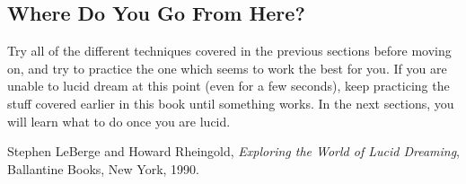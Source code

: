 \documentclass{article}
\begin{document}
\subsection{Where Do You Go From Here?}
Try all of the different techniques covered in the previous sections before moving on, and try to practice the one which seems to work the best for you. If you are unable to lucid dream at this point (even for a few seconds), keep practicing the stuff covered earlier in this book until something works. In the next sections, you will learn what to do once you are lucid. 





\newpage
\begin{thebibliography}{9}

  Stephen LeBerge and Howard Rheingold,
  \textit{Exploring the World of Lucid Dreaming},
  Ballantine Books, New York,
  1990.

\end{thebibliography}
\end{document}
